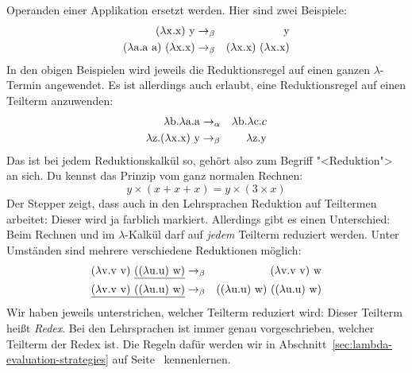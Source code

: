 Operanden einer Applikation ersetzt werden.  Hier sind zwei
Beispiele:
%
\begin{eqnarray*}
  (\lambda \mathrm x.\mathrm x)~\mathrm y & \rightarrow_{\beta} & \mathrm y\\
  (\lambda \mathrm a.\mathrm a~\mathrm a)~(\lambda \mathrm x.\mathrm x) & \rightarrow_{\beta}
  & (\lambda \mathrm x.\mathrm x)~(\lambda \mathrm x.\mathrm x)
\end{eqnarray*}
%
In den obigen Beispielen wird jeweils die Reduktionsregel auf einen
ganzen $\lambda$-Termin angewendet.  Es ist allerdings auch erlaubt,
eine Reduktionsregel auf einen Teilterm anzuwenden:
%
\begin{eqnarray*}
  \lambda \mathrm b.\lambda \mathrm a.\mathrm a & \rightarrow_{\alpha} & \lambda \mathrm b.\lambda \mathrm c.c\\
  \lambda \mathrm z.(\lambda \mathrm x.\mathrm x)~\mathrm y & \rightarrow_{\beta}
                                                              & \lambda \mathrm z.\mathrm y
\end{eqnarray*}
%
Das ist bei jedem Reduktionskalkül so, gehört also zum Begriff
"<Reduktion"> an sich.  Du kennst das Prinzip vom ganz normalen
Rechnen:
%
\begin{displaymath}
  y \times (x + x + x) = y \times (3\times x)
\end{displaymath}
%
Der Stepper zeigt, dass auch in den Lehrsprachen Reduktion auf
Teiltermen arbeitet: Dieser wird ja farblich markiert.  Allerdings
gibt es einen Unterschied: Beim Rechnen und im $\lambda$-Kalkül darf
auf \emph{jedem} Teilterm reduziert werden.  Unter Umständen sind
mehrere verschiedene Reduktionen möglich:
%
\begin{eqnarray*}
  (\lambda \mathrm v .\mathrm v~\mathrm v)~\underline{((\lambda \mathrm u.\mathrm u)~\mathrm w)}
  & \rightarrow_{\beta} & (\lambda \mathrm v .\mathrm v~\mathrm v)~\mathrm w\\
  \underline{(\lambda \mathrm v .\mathrm v~\mathrm v)~((\lambda \mathrm u.\mathrm u)~\mathrm w)}
  & \rightarrow_{\beta} & ((\lambda \mathrm u.\mathrm u)~\mathrm w)~((\lambda \mathrm u.\mathrm u)~\mathrm w)
\end{eqnarray*}
%
Wir haben jeweils unterstrichen, welcher Teilterm reduziert wird:
Dieser Teilterm heißt \textit{Redex}.  Bei den
Lehrsprachen ist immer genau vorgeschrieben, welcher Teilterm der
Redex ist.  Die Regeln dafür werden wir in
Abschnitt~\ref{sec:lambda-evaluation-strategies} auf
Seite~\pageref{sec:lambda-evaluation-strategies} kennenlernen.


